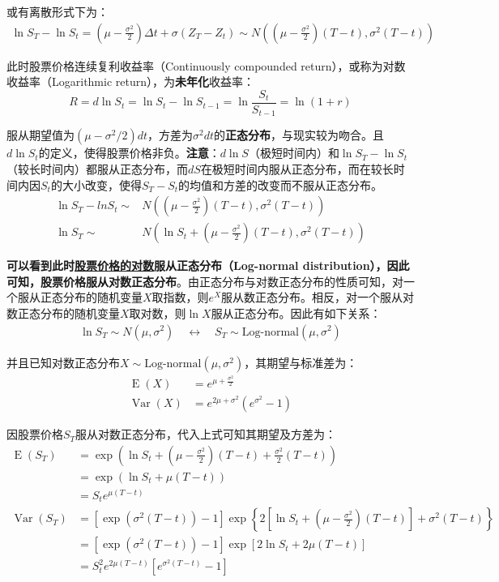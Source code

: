 \documentclass[11pt]{article}
\newcommand{\E}{\operatorname{E}}
\newcommand{\Var}{\operatorname{Var}}
\begin{document}
或有离散形式下为：
\begin{align*}
    \ln S_T - \ln S_t = \left( \mu - \frac{\sigma^2}{2} \right) \Delta t + \sigma (Z_T - Z_t) \sim N \left((\mu-\frac{\sigma^2}{2})(T-t), \sigma^2(T-t) \right)
\end{align*}

此时股票价格连续复利收益率（Continuously compounded return），或称为对数收益率（Logarithmic return），为\textbf{未年化}收益率：
\begin{equation}
    R = d\ln S_t= \ln S_t - \ln S_{t-1} = \ln \frac{S_t}{S_{t-1}} = \ln (1+r)
\end{equation}

服从期望值为$(\mu - \sigma^2/2)dt$，方差为$\sigma^2 dt$的\textbf{正态分布}，与现实较为吻合。且$d\ln S_t$的定义，使得股票价格非负。\textbf{注意}：$d\ln S$（极短时间内）和$\ln S_T - \ln S_t$（较长时间内）都服从正态分布，而$dS$在极短时间内服从正态分布，而在较长时间内因$S_t$的大小改变，使得$S_T - S_t$的均值和方差的改变而不服从正态分布。
\begin{align*}
    \ln S_T - ln S_t \sim & N \left( (\mu-\frac{\sigma^2}{2})(T-t), \sigma^2(T-t)\right) \\
    \ln S_T  \sim & N \left(\ln S_t + (\mu-\frac{\sigma^2}{2})(T-t), \sigma^2(T-t)\right)
\end{align*}

\textbf{可以看到此时\underline{股票价格的对数}服从正态分布（Log-normal distribution），因此可知，股票价格服从对数正态分布}。由正态分布与对数正态分布的性质可知，对一个服从正态分布的随机变量$X$取指数，则$e^X$服从数正态分布。相反，对一个服从对数正态分布的随机变量$X$取对数，则$\ln X$服从正态分布。因此有如下关系：
\begin{align*}
    \ln S_T \sim N(\mu,\sigma^2) \quad \leftrightarrow \quad S_T \sim \text{Log-normal}(\mu,\sigma^2)
\end{align*}

并且已知对数正态分布$X \sim \text{Log-normal}(\mu,\sigma^2)$，其期望与标准差为：
\begin{align*}
    \E(X) & = e^{\mu+\frac{\sigma^2}{2}} \\
    \Var(X) & = e^{2\mu+\sigma^2} (e^{\sigma^2}-1)
\end{align*}

因股票价格$S_T$服从对数正态分布，代入上式可知其期望及方差为：
\begin{align*}
    \E(S_T)   & = \exp(\ln S_t + (\mu - \frac{\sigma^2}{2})(T-t)+\frac{\sigma^2}{2}(T-t)) \\
    & = \exp(\ln S_t + \mu(T-t)) \\
    & = S_t e^{\mu(T-t)} \\
    \Var(S_T) & = \left[\exp(\sigma^2(T-t))-1\right] \exp \left\{2\left[\ln S_t + (\mu - \frac{\sigma^2}{2})(T-t)\right] + \sigma^2(T-t)\right\} \\
    & = \left[\exp(\sigma^2(T-t))-1\right] \exp\left[2 \ln S_t + 2\mu (T-t)\right] \\
    & = S_t^2 e^{2\mu(T-t)} \left[ e^{\sigma^2 (T-t)} - 1 \right]
\end{align*}
\end{document}
